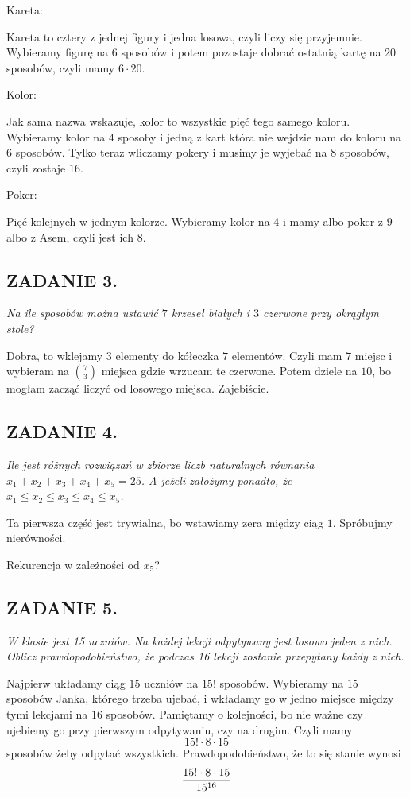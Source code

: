 \documentclass{article}
\begin{document}
{\color{green}Kareta:}

Kareta to cztery z jednej figury i jedna losowa, czyli liczy się przyjemnie. Wybieramy figurę na $6$ sposobów i potem pozostaje dobrać ostatnią kartę na $20$ sposobów, czyli mamy $6\cdot 20$.

\smallskip

{\color{green}Kolor:}

Jak sama nazwa wskazuje, kolor to wszystkie pięć tego samego koloru. Wybieramy kolor na $4$ sposoby i jedną z kart która nie wejdzie nam do koloru na $6$ sposobów. Tylko teraz wliczamy pokery i musimy je wyjebać na $8$ sposobów, czyli zostaje $16$.
\smallskip

{\color{green}Poker:}

Pięć kolejnych w jednym kolorze. Wybieramy kolor na $4$ i mamy albo poker z $9$ albo z Asem, czyli jest ich $8$.

\subsection*{ZADANIE 3.}
\emph{Na ile sposobów można ustawić $7$ krzeseł białych i $3$ czerwone przy okrągłym stole?}
\smallskip

Dobra, to wklejamy $3$ elementy do kółeczka $7$ elementów. Czyli mam $7$ miejsc i wybieram na ${7\choose 3}$ miejsca gdzie wrzucam te czerwone. Potem dziele na $10$, bo mogłam zacząć liczyć od losowego miejsca. Zajebiście.

\subsection*{ZADANIE 4.}
\emph{Ile jest różnych rozwiązań w zbiorze liczb naturalnych równania $x_1+x_2+x_3+x_4+x_5=25$. A jeżeli założymy ponadto, że $x_1\leq x_2\leq x_3\leq x_4\leq x_5$.}
\smallskip

Ta pierwsza część jest trywialna, bo wstawiamy zera między ciąg $1$. Spróbujmy nierówności.

Rekurencja w zależności od $x_5$?

\subsection*{ZADANIE 5.}
\emph{W klasie jest 15 uczniów. Na każdej lekcji odpytywany jest losowo jeden z nich. Oblicz prawdopodobieństwo, że podczas 16 lekcji zostanie przepytany każdy z nich.}
\smallskip

Najpierw układamy ciąg $15$ uczniów na $15!$ sposobów. Wybieramy na $15$ sposobów Janka, którego trzeba ujebać, i wkładamy go w jedno miejsce między tymi lekcjami na $16$ sposobów. Pamiętamy o kolejności, bo nie ważne czy ujebiemy go przy pierwszym odpytywaniu, czy na drugim. Czyli mamy
$$15!\cdot8\cdot 15$$
sposobów żeby odpytać wszystkich. Prawdopodobieństwo, że to się stanie wynosi
$${15!\cdot8\cdot15\over15^{16}}$$ 
\end{document}
